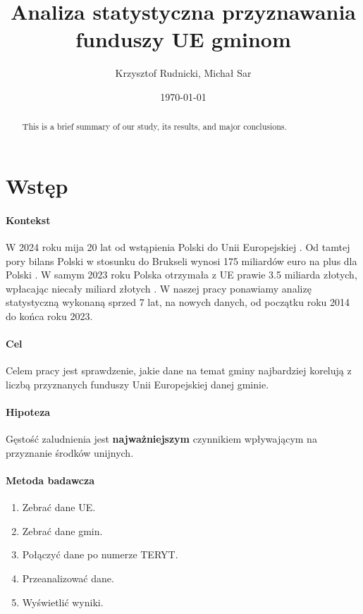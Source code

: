 \documentclass[12pt]{article}
\title{Analiza statystyczna przyznawania funduszy UE gminom}
\author{Krzysztof Rudnicki, Michał Sar}
\date{\today}
\begin{document}
\maketitle

\tableofcontents

\begin{abstract}
    This is a brief summary of our study, its results, and major conclusions.
\end{abstract}

\section{Wstęp}
\paragraph{Kontekst}
W 2024 roku mija 20 lat od wstąpienia Polski do Unii Europejskiej \cite{1}. 
Od tamtej pory bilans Polski w stosunku do Brukseli wynosi 175 miliardów euro na plus dla Polski \cite{2}. W samym 2023 roku Polska otrzymała z UE prawie 3.5 miliarda złotych, wpłacając niecały miliard złotych \cite{3}. W naszej pracy ponawiamy analizę statystyczną wykonaną sprzed 7 lat, na nowych danych, od początku roku 2014 do końca roku 2023.
\paragraph{Cel}
Celem pracy jest sprawdzenie, jakie dane na temat gminy najbardziej korelują z liczbą przyznanych funduszy Unii Europejskiej danej gminie.
\paragraph{Hipoteza}
Gęstość zaludnienia jest \textbf{najważniejszym} czynnikiem wpływającym na przyznanie środków unijnych.
\paragraph{Metoda badawcza}
\begin{enumerate}
    \item Zebrać dane UE.
    \item Zebrać dane gmin.
    \item Połączyć dane po numerze TERYT.
    \item Przeanalizować dane.
    \item Wyświetlić wyniki.
\end{enumerate}
\end{document}
